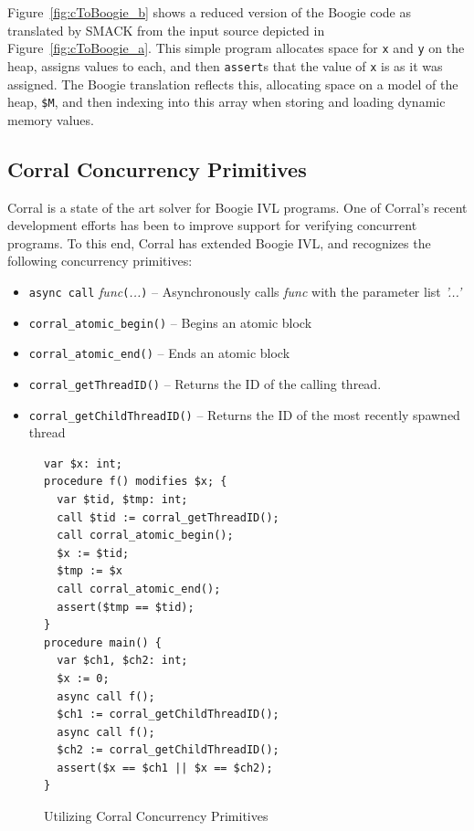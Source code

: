 Figure~\ref{fig:cToBoogie_b} shows a reduced version of the Boogie
code as translated by SMACK from the input source depicted in
Figure~\ref{fig:cToBoogie_a}.  This simple program allocates space for
\lstinline|x| and \lstinline|y| on the heap, assigns values to each,
and then \lstinline|assert|s that the value of \lstinline|x| is as it
was assigned.  The Boogie translation reflects this, allocating space
on a model of the heap, \lstinline|$M|, and then indexing into this
array when storing and loading dynamic memory values.

\subsection{Corral Concurrency Primitives}
Corral is a state of the art solver for Boogie IVL programs.  One of
Corral's recent development efforts has been to improve support for
verifying concurrent programs.  To this end, Corral has extended
Boogie IVL, and recognizes the following concurrency primitives:

\begin{itemize}
\item \lstinline|async call|
  \emph{func}\lstinline|(|\emph{...}\lstinline|)| -- Asynchronously
  calls \emph{func} with the parameter list \emph{'...'} 
\item \lstinline|corral_atomic_begin()| -- Begins an atomic block
\item \lstinline|corral_atomic_end()| -- Ends an atomic block
\item \lstinline|corral_getThreadID()| -- Returns the ID of the
  calling thread.
\item \lstinline|corral_getChildThreadID()| -- Returns the ID of the
  most recently spawned thread
\end{itemize}

\begin{figure}[h]
\centering
\caption{Utilizing Corral Concurrency Primitives}
\label{fig:corralprimitives}
\begin{lstlisting}[language=boogie]
var $x: int;
procedure f() modifies $x; {
  var $tid, $tmp: int;
  call $tid := corral_getThreadID();
  call corral_atomic_begin();
  $x := $tid;
  $tmp := $x
  call corral_atomic_end();
  assert($tmp == $tid);
}
procedure main() {
  var $ch1, $ch2: int;
  $x := 0;
  async call f();
  $ch1 := corral_getChildThreadID();
  async call f();
  $ch2 := corral_getChildThreadID();
  assert($x == $ch1 || $x == $ch2);
}
\end{lstlisting}
\end{figure}


